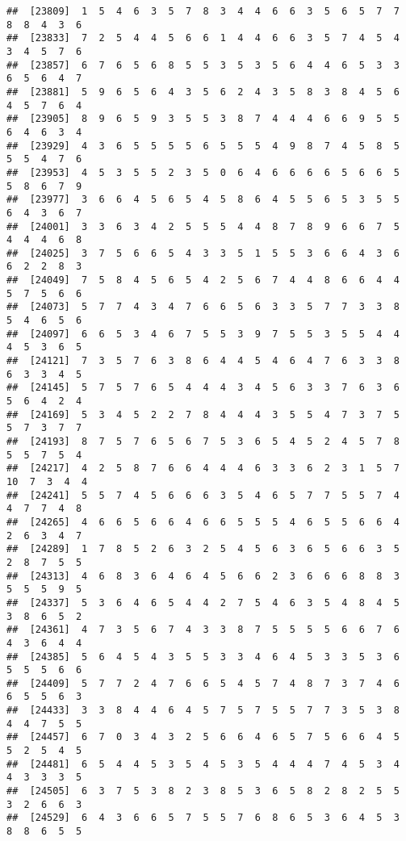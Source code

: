 \documentclass[
]{book}
\begin{document}
\begin{verbatim}
##  [23809]  1  5  4  6  3  5  7  8  3  4  4  6  6  3  5  6  5  7  7  8  8  4  3  6
##  [23833]  7  2  5  4  4  5  6  6  1  4  4  6  6  3  5  7  4  5  4  3  4  5  7  6
##  [23857]  6  7  6  5  6  8  5  5  3  5  3  5  6  4  4  6  5  3  3  6  5  6  4  7
##  [23881]  5  9  6  5  6  4  3  5  6  2  4  3  5  8  3  8  4  5  6  4  5  7  6  4
##  [23905]  8  9  6  5  9  3  5  5  3  8  7  4  4  4  6  6  9  5  5  6  4  6  3  4
##  [23929]  4  3  6  5  5  5  5  6  5  5  5  4  9  8  7  4  5  8  5  5  5  4  7  6
##  [23953]  4  5  3  5  5  2  3  5  0  6  4  6  6  6  6  5  6  6  5  5  8  6  7  9
##  [23977]  3  6  6  4  5  6  5  4  5  8  6  4  5  5  6  5  3  5  5  6  4  3  6  7
##  [24001]  3  3  6  3  4  2  5  5  5  4  4  8  7  8  9  6  6  7  5  4  4  4  6  8
##  [24025]  3  7  5  6  6  5  4  3  3  5  1  5  5  3  6  6  4  3  6  6  2  2  8  3
##  [24049]  7  5  8  4  5  6  5  4  2  5  6  7  4  4  8  6  6  4  4  5  7  5  6  6
##  [24073]  5  7  7  4  3  4  7  6  6  5  6  3  3  5  7  7  3  3  8  5  4  6  5  6
##  [24097]  6  6  5  3  4  6  7  5  5  3  9  7  5  5  3  5  5  4  4  4  5  3  6  5
##  [24121]  7  3  5  7  6  3  8  6  4  4  5  4  6  4  7  6  3  3  8  6  3  3  4  5
##  [24145]  5  7  5  7  6  5  4  4  4  3  4  5  6  3  3  7  6  3  6  5  6  4  2  4
##  [24169]  5  3  4  5  2  2  7  8  4  4  4  3  5  5  4  7  3  7  5  5  7  3  7  7
##  [24193]  8  7  5  7  6  5  6  7  5  3  6  5  4  5  2  4  5  7  8  5  5  7  5  4
##  [24217]  4  2  5  8  7  6  6  4  4  4  6  3  3  6  2  3  1  5  7 10  7  3  4  4
##  [24241]  5  5  7  4  5  6  6  6  3  5  4  6  5  7  7  5  5  7  4  4  7  7  4  8
##  [24265]  4  6  6  5  6  6  4  6  6  5  5  5  4  6  5  5  6  6  4  2  6  3  4  7
##  [24289]  1  7  8  5  2  6  3  2  5  4  5  6  3  6  5  6  6  3  5  2  8  7  5  5
##  [24313]  4  6  8  3  6  4  6  4  5  6  6  2  3  6  6  6  8  8  3  5  5  5  9  5
##  [24337]  5  3  6  4  6  5  4  4  2  7  5  4  6  3  5  4  8  4  5  3  8  6  5  2
##  [24361]  4  7  3  5  6  7  4  3  3  8  7  5  5  5  5  6  6  7  6  4  3  6  4  4
##  [24385]  5  6  4  5  4  3  5  5  3  3  4  6  4  5  3  3  5  3  6  5  5  5  6  6
##  [24409]  5  7  7  2  4  7  6  6  5  4  5  7  4  8  7  3  7  4  6  6  5  5  6  3
##  [24433]  3  3  8  4  4  6  4  5  7  5  7  5  5  7  7  3  5  3  8  4  4  7  5  5
##  [24457]  6  7  0  3  4  3  2  5  6  6  4  6  5  7  5  6  6  4  5  5  2  5  4  5
##  [24481]  6  5  4  4  5  3  5  4  5  3  5  4  4  4  7  4  5  3  4  4  3  3  3  5
##  [24505]  6  3  7  5  3  8  2  3  8  5  3  6  5  8  2  8  2  5  5  3  2  6  6  3
##  [24529]  6  4  3  6  6  5  7  5  5  7  6  8  6  5  3  6  4  5  3  8  8  6  5  5

\end{verbatim}
\end{document}
